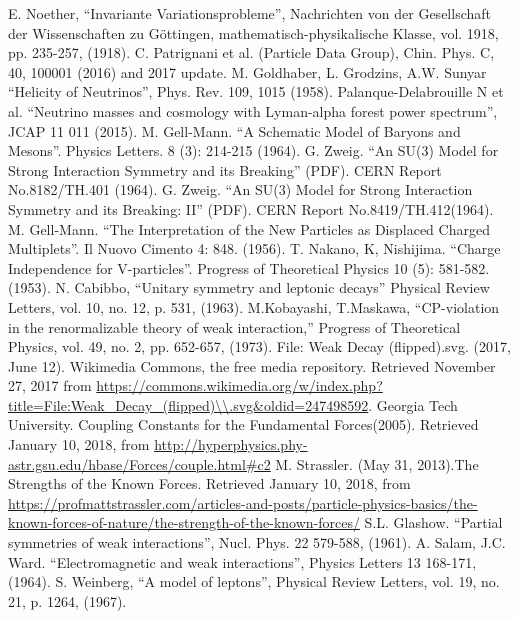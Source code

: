 \documentclass[print]{nuthesis}
\begin{document}
\begin{thebibliography}{300}
  E. Noether, ``Invariante Variationsprobleme'', Nachrichten von der Gesellschaft der Wissenschaften zu G\"ottingen, mathematisch-physikalische Klasse, vol. 1918, pp. 235-257, (1918).
 C. Patrignani et al. (Particle Data Group), Chin. Phys. C, 40, 100001 (2016) and 2017 update.  
 M. Goldhaber, L. Grodzins, A.W. Sunyar ``Helicity of Neutrinos'', Phys. Rev. 109, 1015 (1958).
 Palanque-Delabrouille N et al. ``Neutrino masses and cosmology with Lyman-alpha forest power spectrum'', JCAP 11 011 (2015).
 M. Gell-Mann. ``A Schematic Model of Baryons and Mesons''. Physics Letters. 8 (3): 214-215 (1964).
 G. Zweig. ``An SU(3) Model for Strong Interaction Symmetry and its Breaking'' (PDF). CERN Report No.8182/TH.401 (1964).
 G. Zweig. ``An SU(3) Model for Strong Interaction Symmetry and its Breaking: II'' (PDF). CERN Report No.8419/TH.412(1964).
 M. Gell-Mann. ``The Interpretation of the New Particles as Displaced Charged Multiplets''. Il Nuovo Cimento 4: 848. (1956).
 T. Nakano, K, Nishijima. ``Charge Independence for V-particles''. Progress of Theoretical Physics 10 (5): 581-582. (1953).  
 N. Cabibbo, ``Unitary symmetry and leptonic decays'' Physical Review Letters, vol. 10, no. 12, p. 531, (1963).
 M.Kobayashi, T.Maskawa, ``CP-violation in the renormalizable theory of weak interaction,'' Progress of Theoretical Physics, vol. 49, no. 2, pp. 652-657, (1973).
 File: Weak Decay (flipped).svg. (2017, June 12). Wikimedia Commons, the free media repository. Retrieved November 27, 2017 from \url{https://commons.wikimedia.org/w/index.php?title=File:Weak\_Decay\_(flipped)\\.svg\&oldid=247498592}.
 Georgia Tech University. Coupling Constants for the Fundamental Forces(2005). Retrieved January 10, 2018, from \url{http://hyperphysics.phy-astr.gsu.edu/hbase/Forces/couple.html\#c2}
 M. Strassler. (May 31, 2013).The Strengths of the Known Forces. Retrieved January 10, 2018, from \url{https://profmattstrassler.com/articles-and-posts/particle-physics-basics/the-known-forces-of-nature/the-strength-of-the-known-forces/}
 S.L. Glashow. ``Partial symmetries of weak interactions'', Nucl. Phys. 22 579-588, (1961).
 A. Salam, J.C. Ward. ``Electromagnetic and weak interactions'', Physics Letters 13 168-171, (1964).
 S. Weinberg, ``A model of leptons'', Physical Review Letters, vol. 19, no. 21, p. 1264, (1967).

\end{thebibliography}
\end{document}
